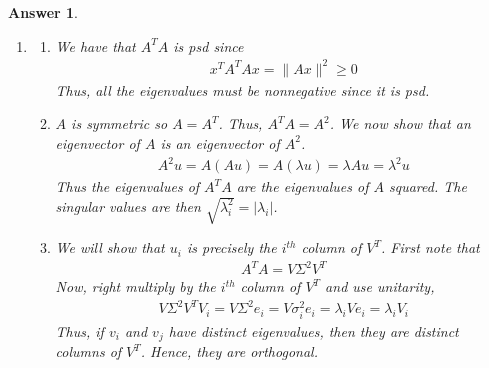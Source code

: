 \documentclass[12pt]{article}
\theoremstyle{colon}
\newtheorem*{answer}{Answer}
\begin{document}
\begin{answer}
  \leavevmode
  \begin{enumerate}[label=\arabic*)]
    \item
      \begin{enumerate}[label=\alph*)]
        \item We have that $A^T A$ is psd since
          \begin{gather*}
            x^T A^T A x = \lVert A x \rVert^2 \geq 0
          \end{gather*}
          Thus, all the eigenvalues must be nonnegative since it is psd.

        \item $A$ is symmetric so $A = A^T$. Thus, $A^T A = A^2$. We now show that an eigenvector of $A$ is an eigenvector of $A^2$.
          \begin{gather*}
            A^2 u = A (A u) = A(\lambda u) = \lambda A u = \lambda^2 u
          \end{gather*}
          Thus the eigenvalues of $A^T A$ are the eigenvalues of $A$ squared. The singular values are then $\sqrt{\lambda_i^2} = \lvert \lambda_i \rvert$.

        \item We will show that $u_i$ is precisely the $i^{th}$ column of $V^T$. First note that
          \begin{gather*}
            A^T A = V \Sigma^2 V^T
          \end{gather*}
          Now, right multiply by the $i^{th}$ column of $V^T$ and use unitarity,
          \begin{gather*}
            V \Sigma^2 V^T V_i = V \Sigma^2 e_i = V \sigma_i^2 e_i = \lambda_i V e_i = \lambda_i V_i
          \end{gather*}
          Thus, if $v_i$ and $v_j$ have distinct eigenvalues, then they are distinct columns of $V^T$. Hence, they are orthogonal.
      \end{enumerate}


\end{enumerate}
\end{answer}
\end{document}
